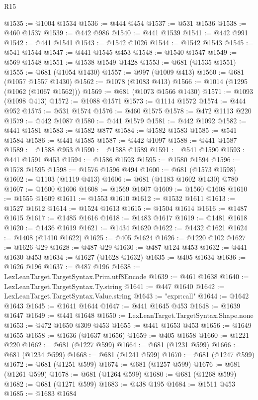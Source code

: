 \begin{lexlean}{R15}
\begin{coremodule}
@1535 := @1004 @1534
@1536 := @444 @454
@1537 := @531 @1536
@1538 := @460 @1537
@1539 := @442 @986
@1540 := @441 @1539
@1541 := @442 @991
@1542 := @441 @1541
@1543 := @1542 @1026
@1544 := @1542 @1543
@1545 := @541 @1544
@1547 := @441 @1545 @453
@1548 := @1540 @1547
@1549 := @569 @1548
@1551 := @1538 @1549 @1428
@1553 := @681 (@1535 @1551)
@1555 := @681 (@1054 @1430)
@1557 := @997 (@1009 @413)
@1560 := @681 (@1057 @1557 @1430)
@1562 := @1078 (@1083 @413)
@1566 := @1014 (@1295 (@1062 (@1067 @1562)))
@1569 := @681 (@1073 @1566 @1430)
@1571 := @1093 (@1098 @413)
@1572 := @1088 @1571
@1573 := @1114 @1572
@1574 := @444 @952
@1575 := @531 @1574
@1576 := @460 @1575
@1578 := @472 @1113 @220
@1579 := @442 @1087
@1580 := @441 @1579
@1581 := @442 @1092
@1582 := @441 @1581
@1583 := @1582 @877
@1584 := @1582 @1583
@1585 := @541 @1584
@1586 := @441 @1585
@1587 := @442 @1097
@1588 := @441 @1587
@1589 := @1588 @953
@1590 := @1588 @1589
@1591 := @541 @1590
@1593 := @441 @1591 @453
@1594 := @1586 @1593
@1595 := @1580 @1594
@1596 := @1578 @1595
@1598 := @1576 @1596 @494
@1600 := @681 (@1573 @1598)
@1602 := @1103 (@1119 @413)
@1606 := @681 (@1183 @1602 @1430) @780
@1607 := @1600 @1606
@1608 := @1569 @1607
@1609 := @1560 @1608
@1610 := @1555 @1609
@1611 := @1553 @1610
@1612 := @1532 @1611
@1613 := @1527 @1612
@1614 := @1524 @1613
@1615 := @1504 @1614
@1616 := @1487 @1615
@1617 := @1485 @1616
@1618 := @1483 @1617
@1619 := @1481 @1618
@1620 := @1436 @1619
@1621 := @1434 @1620
@1622 := @1432 @1621
@1624 := @1408 (@1410 @1622)
@1625 := @405 @1624
@1626 := @1220 @102
@1627 := @1626 @29
@1628 := @487 @29
@1630 := @487 @124 @453
@1632 := @441 @1630 @453
@1634 := @1627 (@1628 @1632)
@1635 := @405 @1634
@1636 := @1626 @196
@1637 := @487 @196
@1638 := LexLeanTarget.TargetSyntax.Prim.utf8Encode
@1639 := @461 @1638
@1640 := LexLeanTarget.TargetSyntax.Ty.string
@1641 := @447 @1640
@1642 := LexLeanTarget.TargetSyntax.Value.string
@1643 := "expr:call"
@1644 := @1642 @1643
@1645 := @1641 @1644
@1647 := @441 @1645 @453
@1648 := @1639 @1647
@1649 := @441 @1648
@1650 := LexLeanTarget.TargetSyntax.Shape.none
@1653 := @472 @1650 @309 @453
@1655 := @441 @1653 @453
@1656 := @1649 @1655
@1658 := @1636 (@1637 @1656)
@1659 := @405 @1658
@1660 := @1221 @220
@1662 := @681 (@1227 @599)
@1664 := @681 (@1231 @599)
@1666 := @681 (@1234 @599)
@1668 := @681 (@1241 @599)
@1670 := @681 (@1247 @599)
@1672 := @681 (@1251 @599)
@1674 := @681 (@1257 @599)
@1676 := @681 (@1261 @599)
@1678 := @681 (@1264 @599)
@1680 := @681 (@1268 @599)
@1682 := @681 (@1271 @599)
@1683 := @438 @195
@1684 := @1511 @453
@1685 := @1683 @1684

\end{coremodule}
\end{lexlean}
